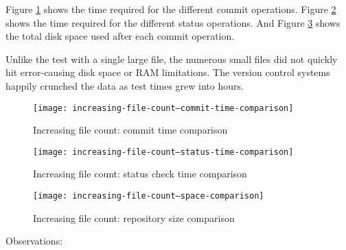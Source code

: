 \documentclass[a4paper]{article}
\begin{document}
Figure \ref{fig:increasing-file-count--commit-time-comparison} shows the time
required for the different commit operations. Figure
\ref{fig:increasing-file-count--status-time-comparison} shows the time required
for the different status operations. And Figure
\ref{fig:increasing-file-count--space-comparison} shows the total disk space
used after each commit operation.

Unlike the test with a single large file, the numerous small files did not
quickly hit error-causing disk space or RAM limitations. The version control
systems happily crunched the data as test times grew into hours.

\begin{figure}[h]
  \caption{Increasing file count: commit time comparison}
  \label{fig:increasing-file-count--commit-time-comparison}
  \centering
    \texttt{[image: increasing-file-count--commit-time-comparison]}
\end{figure}

\begin{figure}[h]
  \caption{Increasing file count: status check time comparison}
  \label{fig:increasing-file-count--status-time-comparison}
  \centering
    \texttt{[image: increasing-file-count--status-time-comparison]}
\end{figure}

\begin{figure}[h]
  \caption{Increasing file count: repository size comparison}
  \label{fig:increasing-file-count--space-comparison}
  \centering
    \texttt{[image: increasing-file-count--space-comparison]}
\end{figure}

Observations:
\end{document}
